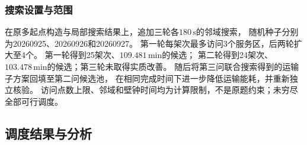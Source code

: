 \documentclass[bwprint]{gmcmthesis}
\begin{document}
\subsubsection{搜索设置与范围}
在原多起点构造与局部搜索结果上，追加三轮各$180\,\mathrm{s}$的邻域搜索，
随机种子分别为20260925、20260926和20260927。
第一轮每架次最多访问3个服务区，后两轮扩大至4个。
第一轮得到25架次、$109.481\,\mathrm{min}$的候选；
第二轮得到24架次、$103.478\,\mathrm{min}$的候选；第三轮未取得实质改善。
随后将第三问联合搜索得到的运输子方案回填至第二问候选池，
在相同完成时间下进一步降低运输能耗，并重新独立核验。
访问点数上限、邻域和壁钟时间均为计算限制，不是原题约束；未穷尽全部可行调度。

\subsection{调度结果与分析}
\end{document}
